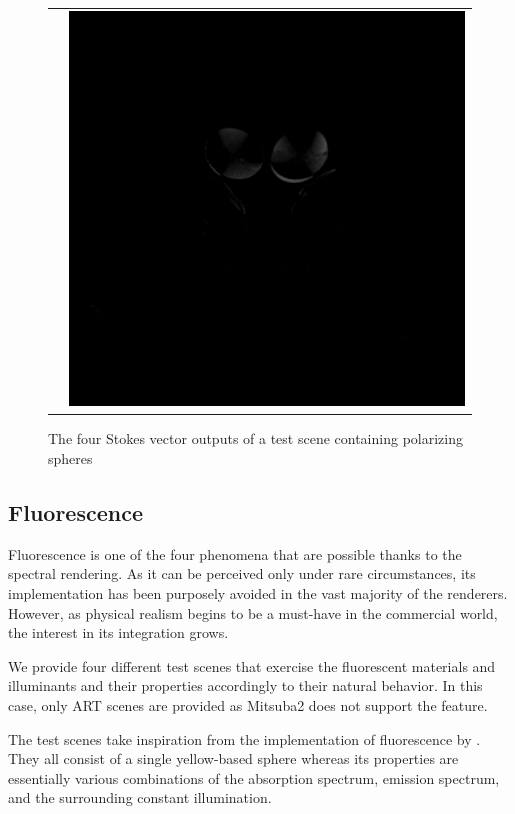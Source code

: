 \begin{figure}[h]
\begin{tabular}{cc}
		&
		\includegraphics[width=.45\linewidth]{img/polarizing_spheres.s3.png}
	\end{tabular}
	\caption{The four Stokes vector outputs of a test scene containing polarizing spheres}
	\label{fig:polar_spheres}
\end{figure}

\subsection{Fluorescence}

Fluorescence is one of the four phenomena that are possible thanks to the spectral rendering. As it can be perceived only under rare circumstances, its implementation has been purposely avoided in the vast majority of the renderers. However, as physical realism begins to be a must-have in the commercial world, the interest in its integration grows.

We provide four different test scenes that exercise the fluorescent materials and illuminants and their properties accordingly to their natural behavior. In this case, only ART scenes are provided as Mitsuba2 does not support the feature. 

The test scenes take inspiration from the implementation of fluorescence by \citet{mojzik2018handling}. They all consist of a single yellow-based sphere whereas its properties are essentially various combinations of the absorption spectrum, emission spectrum, and the surrounding constant illumination.

